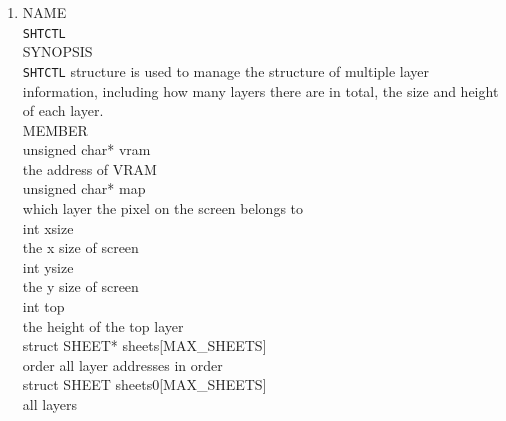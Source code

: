 \documentclass{swfcthesis}
\begin{document}
\begin{enumerate}
  \item
  NAME \\
  \hspace*{1cm}\texttt{SHTCTL} \\
  SYNOPSIS \\
  \hspace*{1cm} \texttt{SHTCTL} structure is used to manage the structure
of multiple layer information, including how many layers there are in total, the size and
height of each layer.\\
  MEMBER \\
  \hspace*{1cm} unsigned char* vram\\
  \hspace*{1.5cm}  the address of VRAM\\
  \hspace*{1cm} unsigned char* map\\
  \hspace*{1.5cm} which layer the pixel on the screen belongs to\\
  \hspace*{1cm} int xsize \\
  \hspace*{1.5cm} the x size of screen\\
  \hspace*{1cm} int ysize\\
  \hspace*{1.5cm} the y size of screen\\
  \hspace*{1cm} int top\\
  \hspace*{1.5cm}  the height of the top layer\\
  \hspace*{1cm} struct SHEET* sheets[MAX\_SHEETS]\\
  \hspace*{1.5cm}  order all layer addresses in order\\
  \hspace*{1cm} struct SHEET sheets0[MAX\_SHEETS]\\
  \hspace*{1.5cm} all layers\\


\end{enumerate}
\end{document}
